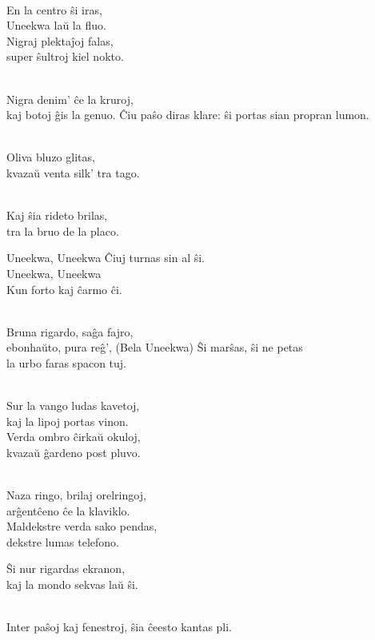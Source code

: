 \begin{lyrics}
\\
En la centro ŝi iras,\\
Uneekwa laŭ la fluo.\\
Nigraj plektaĵoj falas,\\
super ŝultroj kiel nokto.

\\
Nigra denim’ ĉe la kruroj,\\
kaj botoj ĝis la genuo.
Ĉiu paŝo diras klare:
ŝi portas sian propran lumon.

\\
Oliva bluzo glitas,\\
kvazaŭ venta silk’ tra tago.

\\
Kaj ŝia rideto brilas,\\
tra la bruo de la placo.

Uneekwa, Uneekwa
Ĉiuj turnas sin al ŝi.\\
Uneekwa, Uneekwa\\
Kun forto kaj ĉarmo ĉi.

\\
Bruna rigardo, saĝa fajro,
\\
ebonhaŭto, pura reĝ’,
(Bela Uneekwa)
Ŝi marŝas, ŝi ne petas
\\
la urbo faras spacon tuj.

\\
Sur la vango ludas kavetoj,\\
kaj la lipoj portas vinon.\\
Verda ombro ĉirkaŭ okuloj,\\
kvazaŭ ĝardeno post pluvo.

\\
Naza ringo, brilaj orelringoj,\\
arĝentĉeno ĉe la klaviklo.\\
Maldekstre verda sako pendas,\\
dekstre lumas telefono.

Ŝi nur rigardas ekranon,\\
kaj la mondo sekvas laŭ ŝi.

\\
Inter paŝoj kaj fenestroj,
ŝia ĉeesto kantas pli.


\end{lyrics}
